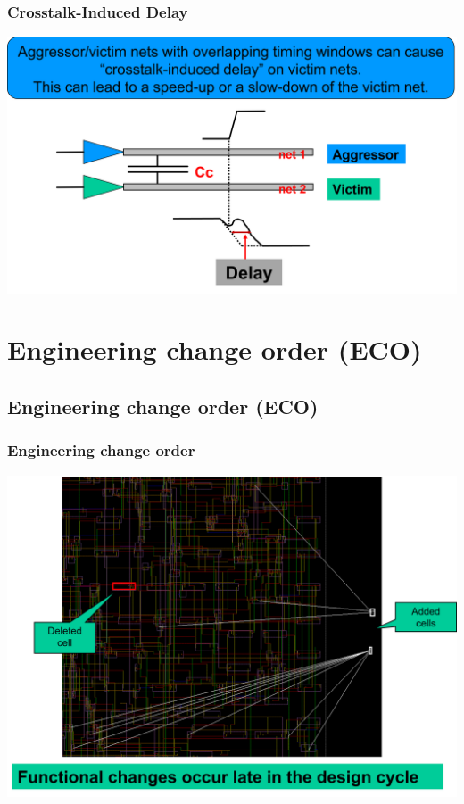 \documentclass[compress]{beamer}
\begin{document}
\begin{frame}
	\frametitle{Crosstalk-Induced Delay}
	\begin{center}
		\includegraphics[width=\textwidth]{Delay}
	\end{center}
\end{frame}

\section[ECO]{Engineering change order (ECO) }
\subsection[ECO]{Engineering change order (ECO) }
\begin{frame}
	\frametitle{Engineering change order}
	\begin{center}
		\includegraphics[width=\textwidth]{ECO}
	\end{center}
\end{frame}
\end{document}

